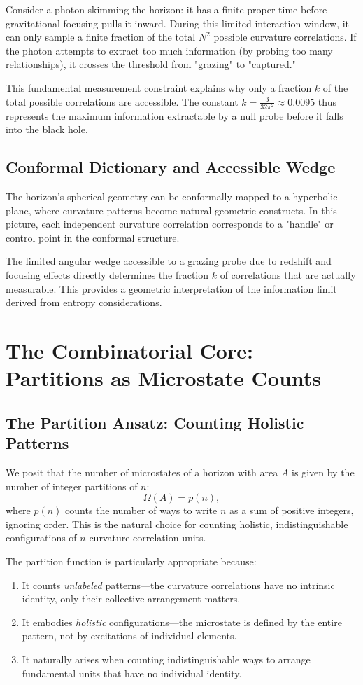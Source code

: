 \documentclass[12pt, letterpaper]{article}
\begin{document}
Consider a photon skimming the horizon: it has a finite proper time before gravitational focusing pulls it inward. During this limited interaction window, it can only sample a finite fraction of the total $N^2$ possible curvature correlations. If the photon attempts to extract too much information (by probing too many relationships), it crosses the threshold from "grazing" to "captured."

This fundamental measurement constraint explains why only a fraction $k$ of the total possible correlations are accessible. The constant $k = \frac{3}{32\pi^2} \approx 0.0095$ thus represents the maximum information extractable by a null probe before it falls into the black hole.

\subsection{Conformal Dictionary and Accessible Wedge}
The horizon's spherical geometry can be conformally mapped to a hyperbolic plane, where curvature patterns become natural geometric constructs. In this picture, each independent curvature correlation corresponds to a "handle" or control point in the conformal structure. 

The limited angular wedge accessible to a grazing probe due to redshift and focusing effects directly determines the fraction $k$ of correlations that are actually measurable. This provides a geometric interpretation of the information limit derived from entropy considerations.

\section{The Combinatorial Core: Partitions as Microstate Counts}
\label{sec:combinatorics}

\subsection{The Partition Ansatz: Counting Holistic Patterns}
We posit that the number of microstates of a horizon with area $A$ is given by the number of integer partitions of $n$:
\[
\Omega(A) = p(n),
\]
where $p(n)$ counts the number of ways to write $n$ as a sum of positive integers, ignoring order. This is the natural choice for counting holistic, indistinguishable configurations of $n$ curvature correlation units. 

The partition function is particularly appropriate because:
\begin{enumerate}
\item It counts \emph{unlabeled} patterns—the curvature correlations have no intrinsic identity, only their collective arrangement matters.
\item It embodies \emph{holistic} configurations—the microstate is defined by the entire pattern, not by excitations of individual elements.
\item It naturally arises when counting indistinguishable ways to arrange fundamental units that have no individual identity.
\end{enumerate}
\end{document}
